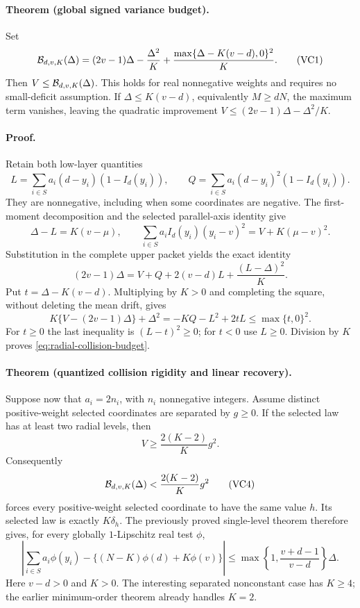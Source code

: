\paragraph{Theorem (global signed variance budget).}
Set
\[
 {\cal B}_{d,v,K}(\Delta)
 =(2v-1)\Delta-\frac{\Delta^2}{K}
   +\frac{\max\{\Delta-K(v-d),0\}^2}{K}.
 \tag{VC1}\label{eq:radial-collision-budget}
\]
Then \(V\le{\cal B}_{d,v,K}(\Delta)\).  This holds for real
nonnegative weights and requires no small-deficit assumption.
If \(\Delta\le K(v-d)\), equivalently \(M\ge dN\), the maximum term
vanishes, leaving the quadratic improvement
\(V\le(2v-1)\Delta-\Delta^2/K\).

\paragraph{Proof.}
Retain both low-layer quantities
\[
 L=\sum_{i\in S}a_i(d-y_i)(1-I_d(y_i)),\qquad
 Q=\sum_{i\in S}a_i(d-y_i)^2(1-I_d(y_i)).
\]
They are nonnegative, including when some coordinates are negative.
The first-moment decomposition and the selected parallel-axis identity give
\[
 \Delta-L=K(v-\mu),\qquad
 \sum_{i\in S}a_iI_d(y_i)(y_i-v)^2=V+K(\mu-v)^2.
\]
Substitution in the complete upper packet yields the exact identity
\begin{equation}
 (2v-1)\Delta
 =V+Q+2(v-d)L+\frac{(L-\Delta)^2}{K}.
 \tag{VC2}\label{eq:radial-collision-exact}
\end{equation}
Put \(t=\Delta-K(v-d)\).  Multiplying by \(K>0\) and completing
the square, without deleting the mean drift, gives
\[
 K\{V-(2v-1)\Delta\}+\Delta^2
 =-KQ-L^2+2tL\le\max\{t,0\}^2.
\]
For \(t\ge0\) the last inequality is \((L-t)^2\ge0\);
for \(t<0\) use \(L\ge0\).  Division by \(K\) proves
\eqref{eq:radial-collision-budget}.

\paragraph{Theorem (quantized collision rigidity and linear recovery).}
Suppose now that \(a_i=2n_i\), with \(n_i\) nonnegative integers.
Assume distinct positive-weight selected coordinates are separated by
\(g\ge0\).  If the selected law has at least two radial levels, then
\begin{equation}
 V\ge\frac{2(K-2)}K g^2.
 \tag{VC3}\label{eq:radial-collision-lower}
\end{equation}
Consequently
\begin{equation}
 {\cal B}_{d,v,K}(\Delta)<\frac{2(K-2)}K g^2
 \tag{VC4}\label{eq:radial-collision-rigidity}
\end{equation}
forces every positive-weight selected coordinate to have the same
value \(h\).  Its selected law is exactly \(K\delta_h\).
The previously proved single-level theorem therefore gives, for every
globally \(1\)-Lipschitz real test \(\phi\),
\[
 \left|\sum_{i\in S}a_i\phi(y_i)
       -\{(N-K)\phi(d)+K\phi(v)\}\right|
 \le
 \max\left\{1,\frac{v+d-1}{v-d}\right\}\Delta.
\]
Here \(v-d>0\) and \(K>0\).  The interesting separated nonconstant
case has \(K\ge4\); the earlier minimum-order theorem already handles
\(K=2\).

